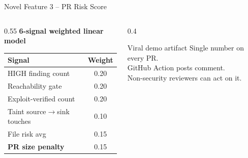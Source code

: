 \documentclass[aspectratio=169,12pt]{beamer}
\newcommand{\bad}[1]{\textbf{\color{acrRed}#1}}
\newcommand{\good}[1]{\textbf{\color{acrGreen}#1}}
\begin{document}
\begin{frame}{Novel Feature 3 -- PR Risk Score}
  \begin{columns}[T]
    \begin{column}{0.55\textwidth}
      \textbf{6-signal weighted linear model}
      \vspace{4pt}
      \begin{tabular}{lc}
        \toprule
        Signal & Weight \\
        \midrule
        HIGH finding count       & 0.20 \\
        Reachability gate        & 0.20 \\
        Exploit-verified count   & 0.20 \\
        Taint source\(\rightarrow\)sink touches & 0.10 \\
        File risk avg            & 0.15 \\
        \textbf{PR size penalty} & 0.15 \\
        \bottomrule
      \end{tabular}
    \end{column}
    \begin{column}{0.4\textwidth}
      \vspace{6pt}
      \begin{exampleblock}{Viral demo artifact}
        Single number on every PR.\\
        GitHub Action posts comment.\\
        Non-security reviewers can act on it.
      \end{exampleblock}
    \end{column}
  \end{columns}
\end{frame}
\end{document}
